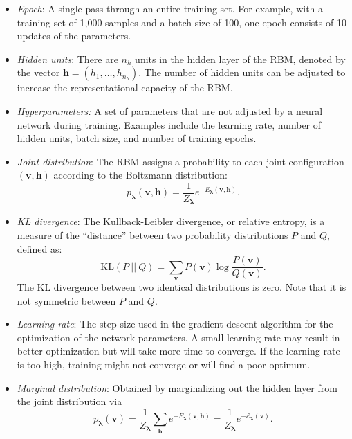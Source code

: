 \documentclass[submission, Phys, hidelnks]{SciPost}
\begin{document}
\begin{itemize}
\item \textit{Epoch}: A single pass through an entire training set. For example,
with a training set of 1,000 samples and a batch size of 100, one epoch consists
of 10 updates of the parameters.

\item \textit{Hidden units}: There are $n_h$ units in the hidden layer of the
RBM, denoted by the vector $\bm{h}=(h_1, \ldots, h_{n_h})$. The number of
hidden units can be adjusted to increase the representational capacity of
the RBM.\@

\item \textit{Hyperparameters:} A set of parameters that are not adjusted by a
neural network during training. Examples include the learning rate, number of
hidden units, batch size, and number of training epochs.

\item \textit{Joint distribution}: The RBM assigns a probability to each joint
configuration $(\bm v, \bm h)$ according to the Boltzmann distribution:
\begin{equation}
   p_{\bm{\lambda}}(\bm{v},\bm{h}) = \frac{1}{Z_{\bm{\lambda}}} e^{-E_{\bm{\lambda}}(\bm{v},\bm{h})}.
\end{equation}

\item \textit{KL divergence}: The Kullback-Leibler divergence, or relative
entropy, is a measure of the ``distance'' between two probability distributions
$P$ and $Q$, defined as:
\begin{equation}
\mathrm{KL}(P\:||\:Q)=\sum_{\bm{v}}P(\bm{v})\log\frac{P(\bm{v})}{Q(\bm{v})} .
\end{equation}
The KL divergence between two identical distributions is zero.
Note that it is not symmetric between $P$ and $Q$.

\item \textit{Learning rate}: The step size used in the gradient descent
algorithm for the optimization of the network parameters. A small learning rate
may result in better optimization but will take more time to converge. If the
learning rate is too high, training might not converge or will find a poor optimum.

\item \textit{Marginal distribution}: Obtained by marginalizing out the hidden layer from the joint distribution via
\begin{equation}\label{Eq:marginal_distribution}
   p_{\bm{\lambda}}(\bm{v}) = \frac{1}{Z_{\bm{\lambda}}} \sum_{\bm{h}} e^{-E_{\bm{\lambda}}(\bm{v},\bm{h})} = \frac{1}{Z_{\bm{\lambda}}} e^{- \mathcal{E}_{\bm{\lambda}}(\bm{v})}.
\end{equation}


\end{itemize}
\end{document}
